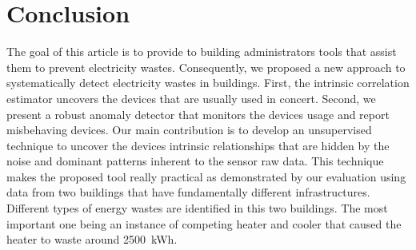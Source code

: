 \section{Conclusion}
The goal of this article is to provide to building administrators tools that assist them to prevent electricity wastes.
Consequently, we proposed a new approach to systematically detect electricity wastes in buildings.
First, the intrinsic correlation estimator uncovers the devices that are usually used in concert.
Second, we present a robust anomaly detector that monitors the devices usage and report misbehaving devices.
Our main contribution is to develop an unsupervised technique to uncover the devices intrinsic relationships that are hidden by the noise and dominant patterns inherent to the sensor raw data.
This technique makes the proposed tool really practical as demonstrated by our evaluation using data from two buildings that have fundamentally different infrastructures.
Different types of energy wastes are identified in this two buildings. 
The most important one being an instance of competing heater and cooler that caused the heater to waste around 2500~kWh.



